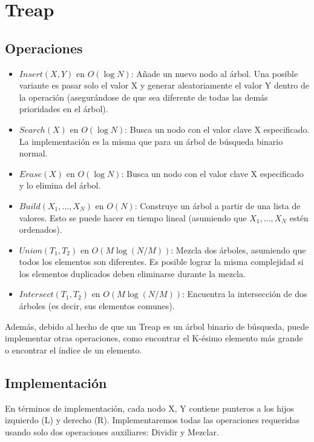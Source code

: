 \documentclass[12pt]{article}
\begin{document}
\section{Treap}

\subsection{Operaciones}

\begin{itemize}
	\item $Insert(X, Y)$ en $O(\log N)$: Añade un nuevo nodo al árbol. Una posible variante es pasar solo el valor X y generar aleatoriamente el valor Y dentro de la operación (asegurándose de que sea diferente de todas las demás prioridades en el árbol).
	\item $Search(X)$ en $O(\log N)$: Busca un nodo con el valor clave X especificado. La implementación es la misma que para un árbol de búsqueda binario normal.
	\item $Erase(X)$ en $O(\log N)$: Busca un nodo con el valor clave X especificado y lo elimina del árbol.
	\item $Build(X_1, ..., X_N)$ en $O(N)$: Construye un árbol a partir de una lista de valores. Esto se puede hacer en tiempo lineal (asumiendo que $X_1, ..., X_N$ estén ordenados).
	\item $Union(T_1, T_2)$ en $O(M \log (N / M))$: Mezcla dos árboles, asumiendo que todos los elementos son diferentes. Es posible lograr la misma complejidad si los elementos duplicados deben eliminarse durante la mezcla.
	\item $Intersect(T_1, T_2)$ en $O(M \log (N / M))$: Encuentra la intersección de dos árboles (es decir, sus elementos comunes).
\end{itemize}

Además, debido al hecho de que un Treap es un árbol binario de búsqueda, puede implementar otras operaciones, como encontrar el K-ésimo elemento más grande o encontrar el índice de un elemento.

\subsection{Implementación}

En términos de implementación, cada nodo X, Y contiene punteros a los hijos izquierdo (L) y derecho (R). Implementaremos todas las operaciones requeridas usando solo dos operaciones auxiliares: Dividir y Mezclar.
\end{document}
